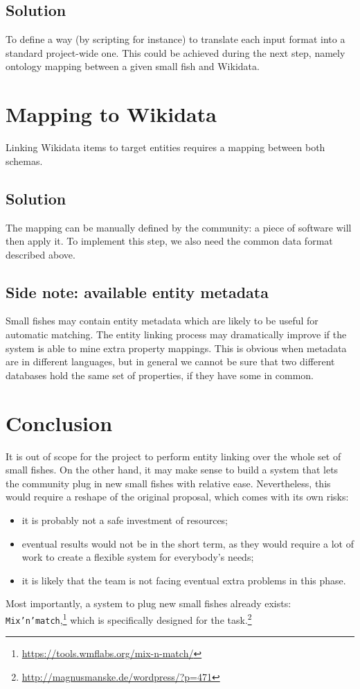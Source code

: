 \subsection{Solution}
\label{cha:322}
To define a way (by scripting for instance) to translate each input format into a standard project-wide one. This could be achieved during the next step, namely ontology mapping between a given small fish and Wikidata.

\section{Mapping to Wikidata}
\label{cha:33}
Linking Wikidata items to target entities requires a mapping between both schemas.

\subsection{Solution}
\label{cha:331}
The mapping can be manually defined by the community: a piece of software will then apply it. To implement this step, we also need the common data format described above.

\subsection{Side note: available entity metadata}
\label{cha:332}
Small fishes may contain entity metadata which are likely to be useful for automatic matching. The entity linking process may dramatically improve if the system is able to mine extra property mappings. This is obvious when metadata are in different languages, but in general we cannot be sure that two different databases hold the same set of properties, if they have some in common.

\section{Conclusion}
\label{cha:34}
It is out of scope for the project to perform entity linking over the whole set of small fishes. On the other hand, it may make sense to build a system that lets the community plug in new small fishes with relative ease. Nevertheless, this would require a reshape of the original proposal, which comes with its own risks:
\begin{itemize}
\item it is probably not a safe investment of resources;
\item eventual results would not be in the short term, as they would require a lot of work to create a flexible system for everybody's needs;
\item it is likely that the team is not facing eventual extra problems in this phase.
\end{itemize}

Most importantly, a system to plug new small fishes already exists: \texttt{Mix'n'match},\footnote{\url{https://tools.wmflabs.org/mix-n-match/}} which is specifically designed for the task.\footnote{\url{http://magnusmanske.de/wordpress/?p=471}}

